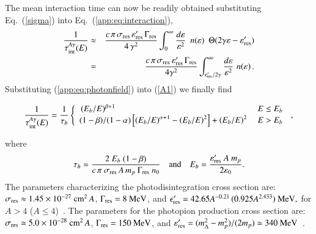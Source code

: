 \documentclass[aps,prd,twocolumn,superscriptaddress,tightenlines,nofootinbib]{revtex4-1}
\begin{document}
The mean interaction time  can now be readily
obtained  substituting Eq.~(\ref{sigma}) into Eq.~(\ref{app:eq:interaction}),
\begin{eqnarray}
  \frac{1}{\tau_{\rm int}^{A\gamma} (E)} & \approx & \frac{c\, \pi\,
    \sigma_{\rm res}
    \,\varepsilon'_{\rm res}\,
\Gamma_{\rm res}}{4\,
    \gamma^2}
  \int_0^\infty \frac{d \varepsilon}{\varepsilon^2}\,\,\, n(\varepsilon) \,\,\,
  \Theta (2 \gamma \varepsilon - \varepsilon'_{\rm res}) \nonumber \\
  & = & \frac{c \, \pi \, \sigma_{\rm res} \,\varepsilon'_{\rm res}\,
    \Gamma_{\rm res}}{4 \gamma^2}
  \int_{\epsilon'_{\rm res}/2 \gamma}^\infty \frac{d\varepsilon}{\varepsilon^2}\,\,
  n (\varepsilon)  \, .
 \label{A1}
\end{eqnarray}
Substituting (\ref{app:eq:photonfield}) into (\ref{A1}) we finally find~\cite{Unger:2015laa}  
\begin{widetext}
\begin{equation}
\frac{1}{\tau_{\rm int}^{A\gamma} (E)} = \frac{1}{\tau_b}
\left\{\begin{array}{ll}  \,
(E_b / E)^{\beta +1} & ~ E \leq E_b  \\
(1-\beta)/(1-\alpha) \left[\left( E_b/E \right)^{\alpha +1} -
  \left(E_b/E\right)^2 \right] +
\left(E_b/E\right)^2 & ~ E > E_b
\end{array} \right. \, ,
\end{equation}
\end{widetext}
where
\begin{equation}
\tau_b = \frac{ 2 \ E_b \ (1-\beta)} {c \, \pi \
  \sigma_{\rm res} \, A \, m_p \ \Gamma_{\rm res}
   \ n_0} \quad {\rm and} \quad
E_b = \frac{\varepsilon'_{\rm res} \ A \ m_p}{2 \varepsilon_0} .
\end{equation}
The parameters characterizing the photodisintegration cross section are:
$\sigma_{\rm res} \approx 1.45\times 10^{-27}~{\rm cm}^2 \, A$,
$\Gamma_{\rm res} = 8~{\rm MeV}$, and $\epsilon'_{\rm res} = 42.65
A^{-0.21} \, (0.925 A^{2.433})~{\rm MeV},$ for $A > 4$ ($A\leq
4$)~\cite{Karakula:1993he}. The parameters for the photopion
production cross section are: $\sigma_{\rm res} \simeq 5.0 \times
10^{-28}~{\rm cm}^2 \, A$, $\Gamma_{\rm res} = 150~{\rm MeV}$, and
$\varepsilon'_{\rm res} = (m_\Delta^2 - m_p^2)/(2 m_p) \simeq 340~{\rm
  MeV}$~\cite{Olive:2016xmw}.
\end{document}
